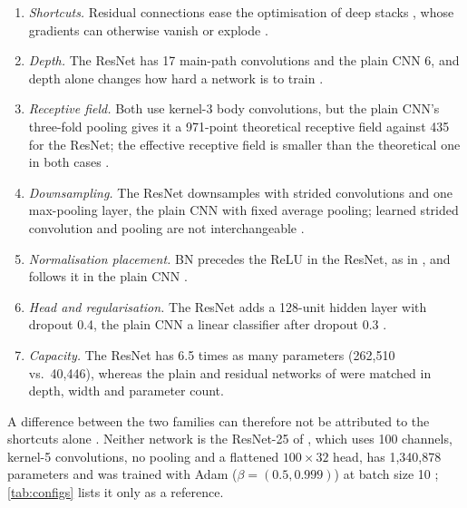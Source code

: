 \documentclass[journal,onecolumn]{IEEEtran}
\begin{document}
\begin{enumerate}
  \item \emph{Shortcuts.} Residual connections ease the optimisation of
        deep stacks \cite{he2016deep,he2016identity}, whose gradients can
        otherwise vanish or explode \cite{bengio1994learning,glorot2010understanding}.
  \item \emph{Depth.} The ResNet has 17 main-path convolutions and the plain
        CNN 6, and depth alone changes how hard a network is to train
        \cite{glorot2010understanding,he2016deep}.
  \item \emph{Receptive field.} Both use kernel-3 body convolutions, but
        the plain CNN's three-fold pooling gives it a 971-point theoretical
        receptive field against 435 for the ResNet; the effective
        receptive field is smaller than the theoretical one in both cases
        \cite{luo2016understanding}.
  \item \emph{Downsampling.} The ResNet downsamples with strided
        convolutions and one max-pooling layer, the plain CNN with fixed
        average pooling; learned strided convolution and pooling are not
        interchangeable \cite{springenberg2015striving}.
  \item \emph{Normalisation placement.} BN precedes the ReLU in the ResNet,
        as in \cite{ioffe2015batch,he2016deep}, and follows it in the plain
        CNN \cite{ioffe2015batch}.
  \item \emph{Head and regularisation.} The ResNet adds a 128-unit hidden
        layer with dropout 0.4, the plain CNN a linear classifier after
        dropout 0.3 \cite{srivastava2014dropout,lin2014network}.
  \item \emph{Capacity.} The ResNet has 6.5 times as many parameters
        (262{,}510 vs.\ 40{,}446), whereas the plain and residual networks
        of \cite{he2016deep} were matched in depth, width and parameter count.
\end{enumerate}
A difference between the two families can therefore not be attributed to
the shortcuts alone \cite{he2016deep}. Neither network is the ResNet-25 of
\cite{ho2019rapid}, which uses 100 channels, kernel-5 convolutions, no
pooling and a flattened $100{\times}32$ head, has 1{,}340{,}878 parameters
and was trained with Adam ($\beta=(0.5,0.999)$) at batch size 10
\cite{ho2019bacteriaid}; \cref{tab:configs} lists it only as a reference.
\end{document}
